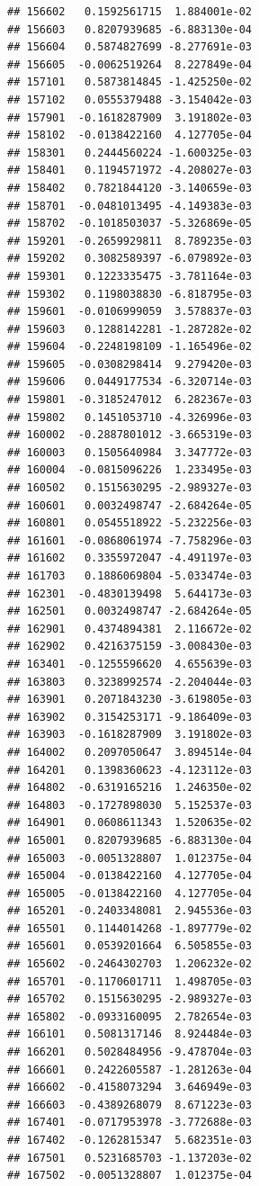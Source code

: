 \documentclass[ignorenonframetext,]{beamer}
\begin{document}
\begin{frame}[fragile]
\begin{verbatim}
## 156602   0.1592561715  1.884001e-02
## 156603   0.8207939685 -6.883130e-04
## 156604   0.5874827699 -8.277691e-03
## 156605  -0.0062519264  8.227849e-04
## 157101   0.5873814845 -1.425250e-02
## 157102   0.0555379488 -3.154042e-03
## 157901  -0.1618287909  3.191802e-03
## 158102  -0.0138422160  4.127705e-04
## 158301   0.2444560224 -1.600325e-03
## 158401   0.1194571972 -4.208027e-03
## 158402   0.7821844120 -3.140659e-03
## 158701  -0.0481013495 -4.149383e-03
## 158702  -0.1018503037 -5.326869e-05
## 159201  -0.2659929811  8.789235e-03
## 159202   0.3082589397 -6.079892e-03
## 159301   0.1223335475 -3.781164e-03
## 159302   0.1198038830 -6.818795e-03
## 159601  -0.0106999059  3.578837e-03
## 159603   0.1288142281 -1.287282e-02
## 159604  -0.2248198109 -1.165496e-02
## 159605  -0.0308298414  9.279420e-03
## 159606   0.0449177534 -6.320714e-03
## 159801  -0.3185247012  6.282367e-03
## 159802   0.1451053710 -4.326996e-03
## 160002  -0.2887801012 -3.665319e-03
## 160003   0.1505640984  3.347772e-03
## 160004  -0.0815096226  1.233495e-03
## 160502   0.1515630295 -2.989327e-03
## 160601   0.0032498747 -2.684264e-05
## 160801   0.0545518922 -5.232256e-03
## 161601  -0.0868061974 -7.758296e-03
## 161602   0.3355972047 -4.491197e-03
## 161703   0.1886069804 -5.033474e-03
## 162301  -0.4830139498  5.644173e-03
## 162501   0.0032498747 -2.684264e-05
## 162901   0.4374894381  2.116672e-02
## 162902   0.4216375159 -3.008430e-03
## 163401  -0.1255596620  4.655639e-03
## 163803   0.3238992574 -2.204044e-03
## 163901   0.2071843230 -3.619805e-03
## 163902   0.3154253171 -9.186409e-03
## 163903  -0.1618287909  3.191802e-03
## 164002   0.2097050647  3.894514e-04
## 164201   0.1398360623 -4.123112e-03
## 164802  -0.6319165216  1.246350e-02
## 164803  -0.1727898030  5.152537e-03
## 164901   0.0608611343  1.520635e-02
## 165001   0.8207939685 -6.883130e-04
## 165003  -0.0051328807  1.012375e-04
## 165004  -0.0138422160  4.127705e-04
## 165005  -0.0138422160  4.127705e-04
## 165201  -0.2403348081  2.945536e-03
## 165501   0.1144014268 -1.897779e-02
## 165601   0.0539201664  6.505855e-03
## 165602  -0.2464302703  1.206232e-02
## 165701  -0.1170601711  1.498705e-03
## 165702   0.1515630295 -2.989327e-03
## 165802  -0.0933160095  2.782654e-03
## 166101   0.5081317146  8.924484e-03
## 166201   0.5028484956 -9.478704e-03
## 166601   0.2422605587 -1.281263e-04
## 166602  -0.4158073294  3.646949e-03
## 166603  -0.4389268079  8.671223e-03
## 167401  -0.0717953978 -3.772688e-03
## 167402  -0.1262815347  5.682351e-03
## 167501   0.5231685703 -1.137203e-02
## 167502  -0.0051328807  1.012375e-04

\end{verbatim}
\end{frame}
\end{document}
